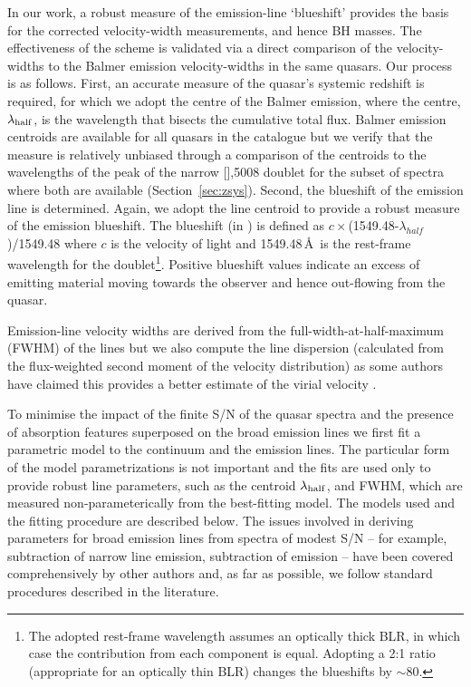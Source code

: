 In our work, a robust measure of the  emission-line `blueshift' provides the basis for the corrected  velocity-width measurements, and hence BH masses.
The effectiveness of the scheme is validated via a direct comparison of the  velocity-widths to the Balmer emission velocity-widths in the same quasars. 
Our process is as follows. 
First, an accurate measure of the quasar's systemic redshift is required, for which we adopt the centre of the Balmer emission, where the centre, $\lambda_{\rm half}$, is the wavelength that bisects the cumulative total flux. 
Balmer emission centroids are available for all quasars in the catalogue but we verify that the measure is relatively unbiased through a comparison of the centroids to the wavelengths of the peak of the narrow [],5008 doublet for the subset of spectra where both are available (Section~\ref{sec:zsys}). 
Second, the blueshift of the  emission line is determined. 
Again, we adopt the line centroid to provide a robust measure of the  emission blueshift.
The blueshift (in \kms) is defined as $c\times$(1549.48-$\lambda_{half}$)/1549.48 where $c$ is the velocity of light and 1549.48\,\AA \ is the rest-frame wavelength for the  doublet\footnote{The adopted  rest-frame wavelength assumes an optically thick BLR, in which case the contribution from each component is equal. Adopting a 2:1 ratio (appropriate for an optically thin BLR) changes the blueshifts by $\sim$80\kms.}. 
Positive blueshift values indicate an excess of emitting material moving towards the observer and hence out-flowing from the quasar. 

Emission-line velocity widths are derived from the full-width-at-half-maximum (FWHM) of the lines but we also compute the line dispersion (calculated from the flux-weighted second moment of the velocity distribution) as some authors have claimed this provides a better estimate of the virial velocity \citep{denney13}. 

To minimise the impact of the finite S/N of the quasar spectra and the presence of absorption features superposed on the broad emission lines we first fit a parametric model to the continuum and the emission lines. 
The particular form of the model parametrizations is not important and the fits are used only to provide robust line parameters, such as the centroid $\lambda_{\rm half}$, and FWHM, which are measured non-parameterically from the best-fitting model. 
The models used and the fitting procedure are described below. 
The issues involved in deriving parameters for broad emission lines from spectra of modest S/N -- for example, subtraction of narrow line emission, subtraction of  emission -- have been covered comprehensively by other authors \citep[e.g.][]{shen11,shen12,denney13,shen16a} and, as far as possible, we follow standard procedures described in the literature. 

